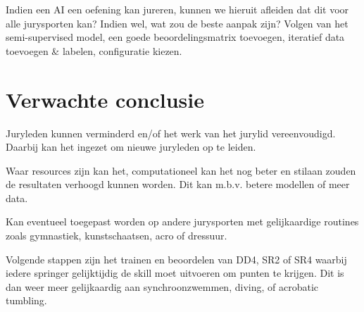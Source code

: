     Indien een AI een oefening kan jureren, kunnen we hieruit afleiden dat dit voor alle jurysporten kan? Indien wel, wat zou de beste aanpak zijn?
    Volgen van het semi-supervised model, een goede beoordelingsmatrix toevoegen, iteratief data toevoegen \& labelen, configuratie kiezen.


\section{Verwachte conclusie}%
\label{sec:conclusie}

    Juryleden kunnen verminderd en/of het werk van het jurylid vereenvoudigd. Daarbij kan het ingezet om nieuwe juryleden op te leiden.
    
    Waar resources zijn kan het, computationeel kan het nog beter en stilaan zouden de resultaten verhoogd kunnen worden. Dit kan m.b.v. betere modellen of meer data.
    
    Kan eventueel toegepast worden op andere jurysporten met gelijkaardige routines zoals gymnastiek, kunstschaatsen, acro of dressuur.
    
    Volgende stappen zijn het trainen en beoordelen van DD4, SR2 of SR4 waarbij iedere springer gelijktijdig de skill moet uitvoeren om punten te krijgen. Dit is dan weer meer gelijkaardig aan synchroonzwemmen, diving, of acrobatic tumbling.
    
